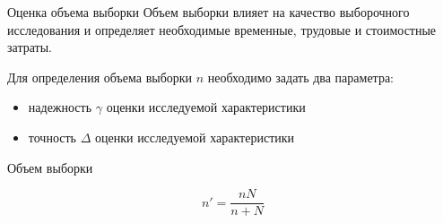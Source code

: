 \documentclass[unicode,11pt,notheorems,xcolor=table]{beamer}
\begin{document}
\begin{frame}{Оценка объема выборки}
    Объем выборки влияет на качество выборочного исследования и определяет необходимые временные, трудовые и стоимостные затраты.

    \begin{block}{}
    Для определения объема выборки $n$ необходимо задать два параметра:
    \begin{itemize}
        \item надежность $\gamma$ оценки исследуемой характеристики
        \item точность $\Delta$ оценки исследуемой характеристики
    \end{itemize}
    \end{block}
    

\end{frame}
\begin{frame}{Объем выборки}
    
    
    \bigskip
    {\centering
{}
\par}

\bigskip


$$
    n'=\frac{nN}{n+N}
$$ 
\end{frame}
\end{document}
